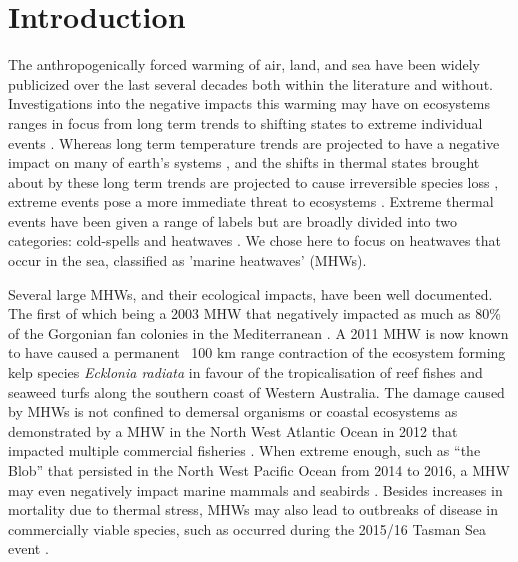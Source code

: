 \documentclass[a4paper,10pt,review]{elsarticle}
\begin{document}
\section{Introduction}
The anthropogenically forced warming of air, land, and sea have been widely publicized over the last several decades both within the literature \citep[e.g.][]{Manabe1967, Sawyer1972, Hansen1981, Cox2000, Rosenzweig2008} and without. Investigations into the negative impacts this warming may have on ecosystems ranges in focus from long term trends \citep[e.g.][]{Scavia2002, Walther2002, Burrows2011} to shifting states \citep[e.g.][]{Travis2003, Grebmeier2006, Blamey2015} to extreme individual events \citep[e.g.][]{Easterling2000, Barrett2008, Wernberg2012a}. Whereas long term temperature trends are projected to have a negative impact on many of earth's systems \citep{IPCC2014}, and the shifts in thermal states brought about by these long term trends are projected to cause irreversible species loss \citep{Thomas2004}, extreme events pose a more immediate threat to ecosystems \citep[e.g.][]{Jolly2005, Denny2009, Hufkens2012}. Extreme thermal events have been given a range of labels but are broadly divided into two categories: cold-spells \citep[e.g.][]{Gunter1941, Lirman2011, Boucek2016} and heatwaves \citep[e.g.][]{Gordon1988, Stott2004, Perkins-Kirkpatrick2016}. We chose here to focus on heatwaves that occur in the sea, classified as 'marine heatwaves' (MHWs).

Several large MHWs, and their ecological impacts, have been well documented. The first of which being a 2003 MHW that negatively impacted as much as 80\% of the Gorgonian fan colonies in the Mediterranean \citep{Garrabou2009}. A 2011 MHW is now known to have caused a permanent ~100 km range contraction of the ecosystem forming kelp species \emph{Ecklonia radiata} in favour of the tropicalisation of reef fishes and seaweed turfs \citep{Wernberg2016} along the southern coast of Western Australia. The damage caused by MHWs is not confined to demersal organisms or coastal ecosystems as demonstrated by a MHW in the North West Atlantic Ocean in 2012 that impacted multiple commercial fisheries \citep{Mills2013}. When extreme enough, such as ``the Blob'' that persisted in the North West Pacific Ocean from 2014 to 2016, a MHW may even negatively impact marine mammals and seabirds \citep{Cavole2016}. Besides increases in mortality due to thermal stress, MHWs may also lead to outbreaks of disease in commercially viable species, such as occurred during the 2015/16 Tasman Sea event \citep{Oliver2017}. 
\end{document}
